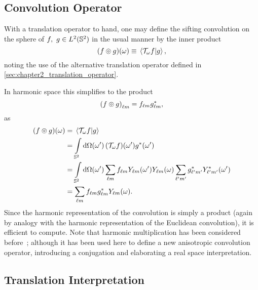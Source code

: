 \subsection{Convolution Operator}

With a translation operator to hand, one may define the sifting convolution on the sphere of \(f,\ g \in \hilbert{\twoSphere}\) in the usual manner by the inner product
%
\begin{equation}\label{eq:chapter2_convolution_real}
	\pixel{\convolution{f}{g}}
	\equiv \braket*{\translation{\omega}f}{g},
\end{equation}
%
noting the use of the alternative translation operator defined in \cref{sec:chapter2_translation_operator}.

In harmonic space this simplifies to the product
%
\begin{equation}\label{eq:chapter2_convolution_harmonic}
	\harmonic{\convolution{f}{g}}
	= \harmonic{f} \conj{\harmonic{g}},
\end{equation}
%
as
%
\begin{align}
	\pixel{(f \circledcirc g)}
	 & = \braket*{\translation{\omega}f}{g} \nonumber{}                                                                                                                                         \\
	 & = \integrateSphere{\omega'} \pixel[']{(\translation{\omega}f)} \pixel[']{\conj{g}} \nonumber{}                                                                                          \\
	 & = \integrateSphere{\omega'} \harmonicSum \harmonic{f} \pixel[']{\harmonic{Y}} \pixel{\harmonic{Y}} \harmonicSum['] \conj{\harmonic[']{g}} \pixel[']{\conj{\harmonic[']{Y}}} \nonumber{} \\
	 & = \harmonicSum \harmonic{f} \conj{\harmonic{g}} \pixel{\harmonic{Y}}.
\end{align}
%
Since the harmonic representation of the convolution is simply a product (again by analogy with the harmonic representation of the Euclidean convolution), it is efficient to compute.
Note that harmonic multiplication has been considered before~\autocite{Kennedy2011}; although it has been used here to define a new anisotropic convolution operator, introducing a conjugation and elaborating a real space interpretation.

\subsection{Translation Interpretation}\label{sec:chapter2_translation_interpretation}

